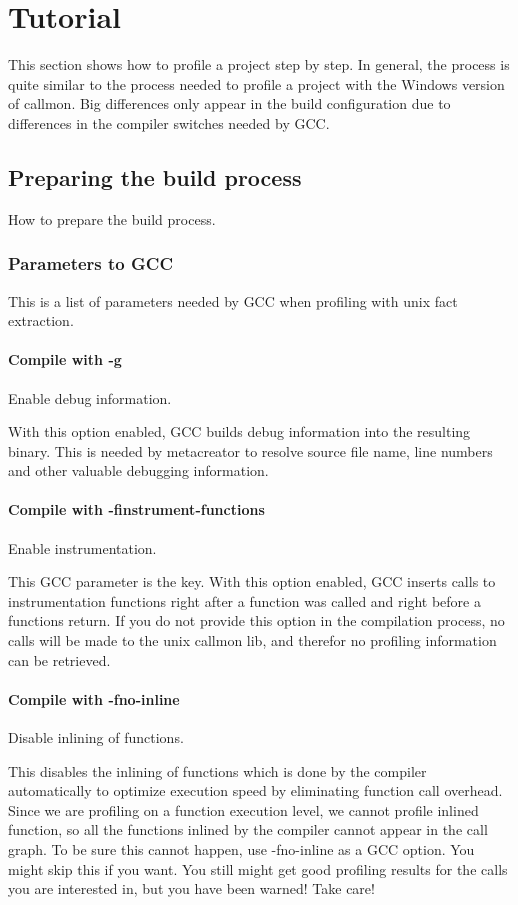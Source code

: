 \section{Tutorial} This section shows how to profile a project step by step. In general, the process is quite similar to the process needed to profile a project with the Windows version of callmon. Big differences only appear in the build configuration due to differences in the compiler switches needed by GCC.

\subsection{Preparing the build process} How to prepare the build process.

\subsubsection{Parameters to GCC} This is a list of parameters needed by GCC when profiling with unix fact extraction.

\paragraph{Compile with -g} Enable debug information.

With this option enabled, GCC builds debug information into the resulting binary. This is needed by metacreator to resolve source file name, line numbers and other valuable debugging information.

\paragraph{Compile with -finstrument-functions} Enable instrumentation.

This GCC parameter is the key. With this option enabled, GCC inserts calls to instrumentation functions right after a function was called and right before a functions return. If you do not provide this option in the compilation process, no calls will be made to the unix callmon lib, and therefor no profiling information can be retrieved.

\paragraph{Compile with -fno-inline} Disable inlining of functions.

This disables the inlining of functions which is done by the compiler automatically to optimize execution speed by eliminating function call overhead. Since we are profiling on a function execution level, we cannot profile inlined function, so all the functions inlined by the compiler cannot appear in the call graph. To be sure this cannot happen, use -fno-inline as a GCC option. You might skip this if you want. You still might get good profiling results for the calls you are interested in, but you have been warned! Take care!

